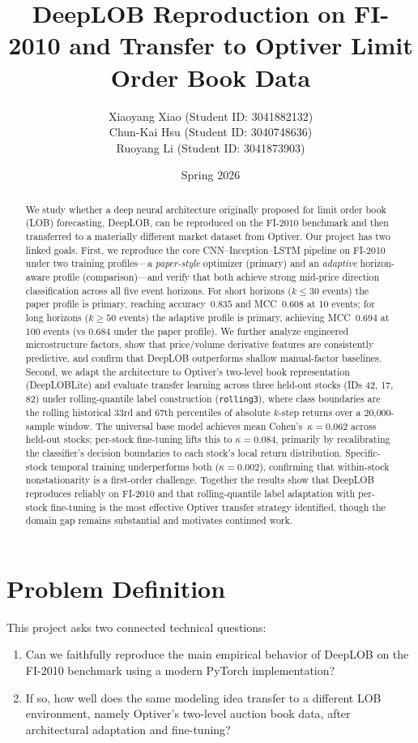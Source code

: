 \documentclass[11pt]{article}
\title{\textbf{DeepLOB Reproduction on FI-2010 and Transfer to Optiver Limit Order Book Data}}
\author{
Xiaoyang Xiao (Student ID: 3041882132) \\
Chun-Kai Hsu (Student ID: 3040748636) \\
Ruoyang Li (Student ID: 3041873903)
}
\date{Spring 2026}
\begin{document}
\maketitle

\begin{abstract}
We study whether a deep neural architecture originally proposed for limit order book (LOB) forecasting, DeepLOB, can be reproduced on the FI-2010 benchmark and then transferred to a materially different market dataset from Optiver. Our project has two linked goals. First, we reproduce the core CNN--Inception--LSTM pipeline on FI-2010 under two training profiles---a \emph{paper-style} optimizer (primary) and an \emph{adaptive} horizon-aware profile (comparison)---and verify that both achieve strong mid-price direction classification across all five event horizons. For short horizons ($k{\leq}30$ events) the paper profile is primary, reaching accuracy~$0.835$ and MCC~$0.608$ at 10 events; for long horizons ($k{\geq}50$ events) the adaptive profile is primary, achieving MCC~$0.694$ at 100 events (vs $0.684$ under the paper profile). We further analyze engineered microstructure factors, show that price/volume derivative features are consistently predictive, and confirm that DeepLOB outperforms shallow manual-factor baselines. Second, we adapt the architecture to Optiver's two-level book representation (DeepLOBLite) and evaluate transfer learning across three held-out stocks (IDs 42, 17, 82) under rolling-quantile label construction (\texttt{rolling3}), where class boundaries are the rolling historical 33rd and 67th percentiles of absolute $k$-step returns over a 20{,}000-sample window. The universal base model achieves mean Cohen's~$\kappa{=}0.062$ across held-out stocks; per-stock fine-tuning lifts this to $\kappa{=}0.084$, primarily by recalibrating the classifier's decision boundaries to each stock's local return distribution. Specific-stock temporal training underperforms both ($\kappa{=}0.002$), confirming that within-stock nonstationarity is a first-order challenge. Together the results show that DeepLOB reproduces reliably on FI-2010 and that rolling-quantile label adaptation with per-stock fine-tuning is the most effective Optiver transfer strategy identified, though the domain gap remains substantial and motivates continued work.
\end{abstract}

\section{Problem Definition}
This project asks two connected technical questions:
\begin{enumerate}[leftmargin=*]
    \item Can we faithfully reproduce the main empirical behavior of DeepLOB on the FI-2010 benchmark using a modern PyTorch implementation?
    \item If so, how well does the same modeling idea transfer to a different LOB environment, namely Optiver's two-level auction book data, after architectural adaptation and fine-tuning?
\end{enumerate}
\end{document}
